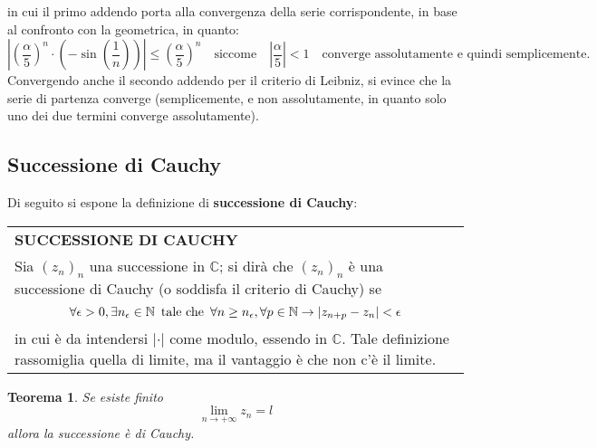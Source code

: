 \documentclass[a4paper]{extarticle}
\newtheorem{theorem}{Teorema}[section]
\renewcommand\arraystretch{}
\begin{document}
in cui il primo addendo porta alla convergenza della serie corrispondente, in base al confronto con la geometrica, in quanto:
\[\left \vert \left(\frac{\alpha}{5}\right)^n \cdot \left(-\sin \left( \frac{1}{n}\right)\right) \right \vert \leq \left( \frac{\alpha}{5}\right)^n \hspace{1em} \text{siccome} \hspace{1em} \left \vert \frac{\alpha}{5} \right \vert < 1 \hspace{1em} \text{converge assolutamente e quindi semplicemente.}\]
Convergendo anche il secondo addendo per il criterio di Leibniz, si evince che la serie di partenza converge (semplicemente, e non assolutamente, in quanto solo uno dei due termini converge assolutamente).

\newpage
\noindent
\subsection{Successione di Cauchy}
Di seguito si espone la definizione di \textbf{successione di Cauchy}:

\vspace{1em}
\setlength{\tabcolsep}{14pt}
\renewcommand{\arraystretch}{2}
\noindent
\begin{tabularx}{\textwidth}{@{}|P|@{}}
    \hline
    {\textbf{SUCCESSIONE DI CAUCHY}}\\
    \parbox{\linewidth}{Sia $(z_n)_n$ una successione in $\mathbb{C}$; si dirà che $(z_n)_n$ è una successione di Cauchy (o soddisfa il criterio di Cauchy) se
    \[\forall \epsilon > 0, \exists n_\epsilon \in \mathbb{N} \hspace{0.5em} \text{tale che} \hspace{0.5em} \forall n \geq n_\epsilon, \forall p \in \mathbb{N} \rightarrow \left \vert z_{n+p} - z_n \right \vert < \epsilon\]
    in cui è da intendersi $\vert \cdot \vert$ come modulo, essendo in $\mathbb{C}$. Tale definizione rassomiglia quella di limite, ma il vantaggio è che non c'è il limite.
    \vspace{3mm}}\\
    \hline
\end{tabularx}

\vspace{2em}
\noindent
\begin{theorem} 
    Se esiste finito
    \[\lim_{n \to +\infty} z_n = l\]
    allora la successione è di Cauchy.
\end{theorem}
\end{document}
